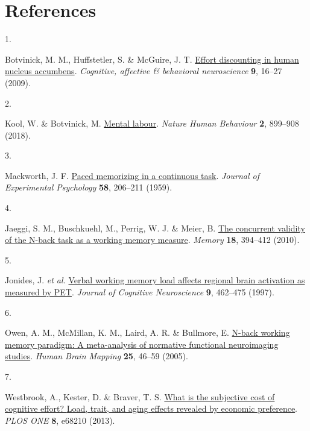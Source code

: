 \documentclass[
  man,floatsintext]{apa6}
\newlength{\cslhangindent}
\newlength{\csllabelwidth}
\newlength{\cslentryspacingunit} %
\newenvironment{CSLReferences}[2] %
 {%
  \setlength{\parindent}{0pt}
  \ifodd #1
  \let\oldpar\par
  \def\par{\hangindent=\cslhangindent\oldpar}
  \fi
  \setlength{\parskip}{#2\cslentryspacingunit}
 }%
 {}
\newcommand{\CSLLeftMargin}[1]{\parbox[t]{\csllabelwidth}{#1}}
\newcommand{\CSLRightInline}[1]{\parbox[t]{\linewidth - \csllabelwidth}{#1}\break}
\begin{document}
\newpage

\hypertarget{references}{%
\section{References}\label{references}}

\begingroup
\setlength{\parindent}{-0.5in}
\setlength{\leftskip}{0.5in}

\hypertarget{refs}{}
\begin{CSLReferences}{0}{0}
\leavevmode{}%
\CSLLeftMargin{1. }%
\CSLRightInline{Botvinick, M. M., Huffstetler, S. \& McGuire, J. T. \href{https://doi.org/10.3758/CABN.9.1.16}{Effort discounting in human nucleus accumbens}. \emph{Cognitive, affective \& behavioral neuroscience} \textbf{9}, 16--27 (2009).}

\leavevmode{}%
\CSLLeftMargin{2. }%
\CSLRightInline{Kool, W. \& Botvinick, M. \href{https://doi.org/10.1038/s41562-018-0401-9}{Mental labour}. \emph{Nature Human Behaviour} \textbf{2}, 899--908 (2018).}

\leavevmode{}%
\CSLLeftMargin{3. }%
\CSLRightInline{Mackworth, J. F. \href{https://doi.org/10.1037/h0049090}{Paced memorizing in a continuous task}. \emph{Journal of Experimental Psychology} \textbf{58}, 206--211 (1959).}

\leavevmode{}%
\CSLLeftMargin{4. }%
\CSLRightInline{Jaeggi, S. M., Buschkuehl, M., Perrig, W. J. \& Meier, B. \href{https://doi.org/10.1080/09658211003702171}{The concurrent validity of the {N}-back task as a working memory measure}. \emph{Memory} \textbf{18}, 394--412 (2010).}

\leavevmode{}%
\CSLLeftMargin{5. }%
\CSLRightInline{Jonides, J. \emph{et al.} \href{https://doi.org/10.1162/jocn.1997.9.4.462}{Verbal working memory load affects regional brain activation as measured by {PET}}. \emph{Journal of Cognitive Neuroscience} \textbf{9}, 462--475 (1997).}

\leavevmode{}%
\CSLLeftMargin{6. }%
\CSLRightInline{Owen, A. M., McMillan, K. M., Laird, A. R. \& Bullmore, E. \href{https://doi.org/10.1002/hbm.20131}{N-back working memory paradigm: A meta-analysis of normative functional neuroimaging studies}. \emph{Human Brain Mapping} \textbf{25}, 46--59 (2005).}

\leavevmode{}%
\CSLLeftMargin{7. }%
\CSLRightInline{Westbrook, A., Kester, D. \& Braver, T. S. \href{https://doi.org/10.1371/journal.pone.0068210}{What is the subjective cost of cognitive effort? {Load}, trait, and aging effects revealed by economic preference}. \emph{PLOS ONE} \textbf{8}, e68210 (2013).}


\end{CSLReferences}
\end{document}
